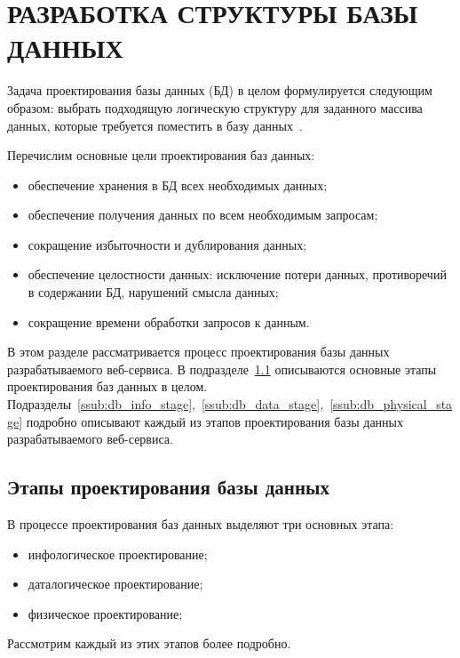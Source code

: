 \section[Разработка структуры БД]{РАЗРАБОТКА СТРУКТУРЫ БАЗЫ ДАННЫХ}
\label{sub:db_structure}

Задача проектирования базы данных (БД) в целом формулируется
следующим образом: выбрать подходящую логическую структуру для заданного
массива данных, которые требуется поместить в базу данных~\cite{date05}.

Перечислим основные цели проектирования баз данных:
\begin{itemize}
\item
  обеспечение хранения в БД всех необходимых данных;
\item
  обеспечение получения данных по всем необходимым запросам;
\item
  сокращение избыточности и дублирования данных;
\item
  обеспечение целостности данных: исключение потери данных, противоречий в
  содержании БД, нарушений смысла данных;
\item
  сокращение времени обработки запросов к данным.
\end{itemize}

В этом разделе рассматривается процесс проектирования базы данных разрабатываемого
веб-сервиса.
В подразделе~\ref{ssub:db_structure_stages} описываются основные этапы проектирования
баз данных в целом.
Подразделы~\ref{ssub:db_info_stage},~\ref{ssub:db_data_stage},~\ref{ssub:db_physical_stage}
подробно описывают каждый из этапов проектирования базы данных разрабатываемого веб-сервиса.

\subsection{Этапы проектирования базы данных}
\label{ssub:db_structure_stages}

В процессе проектирования баз данных выделяют три основных этапа:
\begin{itemize}
\item инфологическое проектирование;
\item даталогическое проектирование;
\item физическое проектирование;
\end{itemize}

Рассмотрим каждый из этих этапов более подробно.

